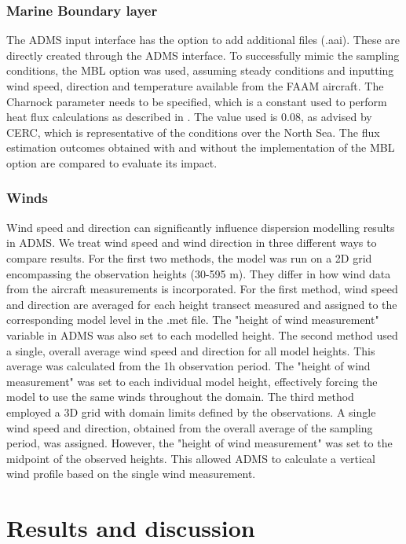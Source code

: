 \documentclass[12pt]{article}
\begin{document}
\subsubsection{Marine Boundary layer}
The ADMS input interface has the option to add additional files (.aai). These are directly created through the ADMS interface. To successfully mimic the sampling conditions, the MBL option was used, assuming steady conditions and inputting wind speed, direction and temperature available from the FAAM aircraft. The Charnock parameter needs to be specified, which is a constant used to perform heat flux calculations as described in \cite{CambridgeEnvironmentalResearchConsultants2020ADMSGuide}. The value used is 0.08, as advised by CERC, which is representative of the conditions over the North Sea. 
The flux estimation outcomes obtained with and without the implementation of the MBL option are compared to evaluate its impact.
\subsubsection{Winds}
Wind speed and direction can significantly influence dispersion modelling results in ADMS.  We treat wind speed and wind direction in three different ways to compare results. 
For the first two methods, the model was run on a 2D grid encompassing the observation heights (30-595 m). They differ in how wind data from the aircraft measurements is incorporated. For the first method, wind speed and direction are averaged for each height transect measured and assigned to the corresponding model level in the .met file. The "height of wind measurement" variable in ADMS was also set to each modelled height. The second method used a single, overall average wind speed and direction for all model heights. This average was calculated from the  1h observation period. The "height of wind measurement" was set to each individual model height, effectively forcing the model to use the same winds throughout the domain.
The third method employed a 3D grid with domain limits defined by the observations. A single wind speed and direction, obtained from the overall average of the sampling period, was assigned. However, the "height of wind measurement" was set to the midpoint of the observed heights. This allowed ADMS to calculate a vertical wind profile based on the single wind measurement.

\newpage\section{Results and discussion}\label{res}
\end{document}
